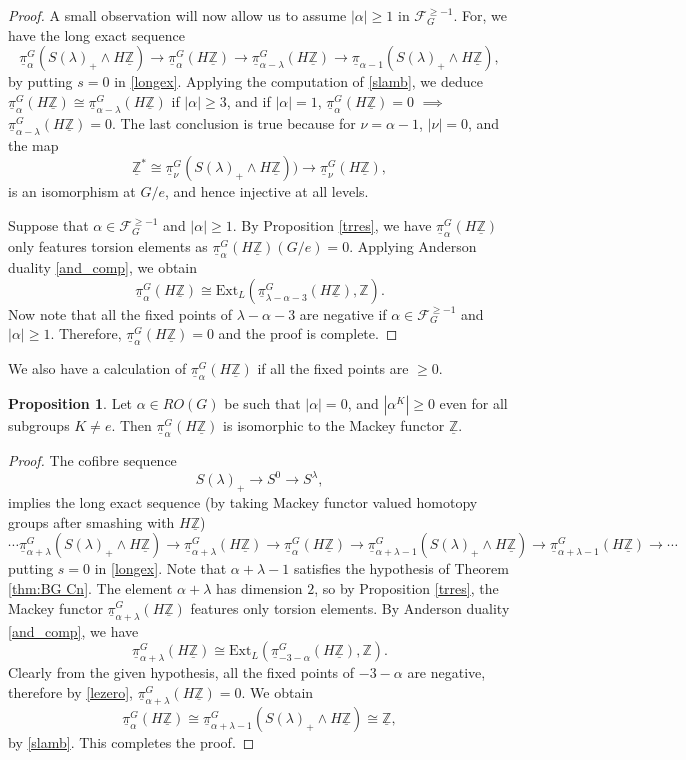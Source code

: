 \documentclass[a4paper,leqno,11pt]{amsart}
\theoremstyle{plain}
\theoremstyle{definition}
\newtheorem{prop}[theorem]{Proposition}
\theoremstyle{remark}
\theoremstyle{definition}
\newcommand{\Z}{{\mathbb{Z}}}
\newcommand{\upi}{\underline{\pi}}
\newcommand\FF{{\mathcal F}}
\newcommand{\Ext}{\mbox{Ext}}
\newcommand{\uZ}{\underline{\mathbb{Z}}}
\def\Z{\mathbb{Z}}
\numberwithin{equation}{section}
\begin{document}
\begin{proof}
	A small observation will now allow us to assume $|\alpha|\geq 1$ in $\FF^{\geq -1}_G$. For, we have the long exact sequence  
	\[ \upi_{\alpha }^G(  S(\lambda)_+\wedge H\uZ) \to \upi_\alpha^G ( H\uZ)\to \upi^G_{\alpha - \lambda}( H\uZ)\to \upi_{\alpha - 1}(  S(\lambda)_+\wedge H\uZ),\]
	by putting $s=0$ in \eqref{longex}. Applying the computation of \eqref{slamb}, we deduce $\upi_\alpha^G(H\uZ) \cong \upi_{\alpha-\lambda}^G(H\uZ)$ if $|\alpha|\geq 3$, and if $|\alpha|=1$, $\upi_\alpha^G(H\uZ)=0$ $\implies$ $\upi_{\alpha-\lambda}^G(H\uZ)=0$. The last conclusion is true because for $\nu= \alpha-1$, $|\nu|=0$, and the map 
\[ \uZ^\ast \cong \upi_\nu^G( S(\lambda)_+\wedge H\uZ)) \to \upi_\nu^G(H\uZ),\]
is an isomorphism at $G/e$, and hence injective at all levels. 
	
	Suppose that $\alpha \in \FF_G^{\geq -1}$ and $|\alpha|\geq 1$. By Proposition \ref{trres}, we have $\upi_\alpha^G(H\uZ)$ only features torsion elements as $\upi_\alpha^G(H\uZ)(G/e)=0$. Applying Anderson duality \eqref{and_comp}, we obtain 
	\[ \upi_\alpha^G(H\uZ) \cong \Ext_L(\upi_{\lambda-\alpha-3}^G(H\uZ),\Z).\]
Now note that all the fixed points of $\lambda - \alpha - 3$ are negative if $\alpha \in \FF_G^{\geq -1}$ and $|\alpha|\geq 1$. Therefore, $\upi_\alpha^G(H\uZ)=0$ and the proof is complete. 	
	\end{proof}
	
We also have a calculation of $\upi_\alpha^G(H\uZ)$ if all the fixed points are $\geq 0$. 	
	\begin{prop}\label{prop:new u mfun}
		Let $ \alpha\in RO(G) $ be such that $ |\alpha |=0 $, and $ |\alpha^K|\ge 0 $ even for all subgroups $ K\ne e $. Then  $ \upi_\alpha^G (H\uZ)$ is isomorphic to the Mackey functor $\uZ $.
	\end{prop}
	
	\begin{proof}
	The cofibre sequence 
	\[ S(\lambda)_+\to S^0 \to S^\lambda,\]
	implies the long exact sequence (by taking Mackey functor valued homotopy groups after smashing with $H\uZ$)
	\[ \cdots \upi_{\alpha +\lambda}^G(  S(\lambda)_+\wedge H\uZ) \to \upi_{\alpha+\lambda}^G ( H\uZ)\to \upi^G_{\alpha}( H\uZ)\to \upi_{\alpha+\lambda -1}^G(  S(\lambda)_+\wedge H\uZ)\to \upi_{\alpha+\lambda-1}^G ( H\uZ) \to \cdots\]
	putting $s=0$ in \eqref{longex}. Note that $\alpha+\lambda -1$ satisfies the hypothesis of Theorem \ref{thm:BG Cn}. The element $\alpha + \lambda$ has dimension $2$, so by Proposition \ref{trres}, the Mackey functor $\upi_{\alpha+\lambda}^G(H\uZ)$ features only torsion elements. By Anderson duality \eqref{and_comp}, we have 
	\[\upi_{\alpha+\lambda}^G(H\uZ) \cong \Ext_L( \upi_{-3-\alpha}^G(H\uZ),\Z).\]
Clearly from the given hypothesis, all the fixed points of $-3-\alpha$ are negative, therefore by \eqref{lezero}, $\upi_{\alpha+\lambda}^G(H\uZ)=0$. We obtain
\[\upi_{\alpha}^G(H\uZ) \cong \upi_{\alpha+\lambda -1}^G(S(\lambda)_+\wedge H\uZ) \cong \uZ,\]
by \eqref{slamb}. This completes the proof. 
	\end{proof}
	
\end{document}
